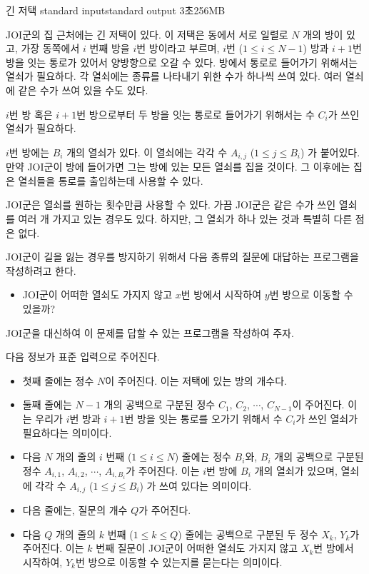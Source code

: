 \begin{problem}{긴 저택}
	{standard input}{standard output}
	{3초}{256MB}{}
	
	JOI군의 집 근처에는 긴 저택이 있다. 이 저택은 동에서 서로 일렬로 $N$ 개의 방이 있고, 가장 동쪽에서 $i$ 번째 방을 $i$번 방이라고 부르며, $i$번 ($1 \le i \le N-1$) 방과 $i+1$번 방을 잇는 통로가 있어서 양방향으로 오갈 수 있다. 방에서 통로로 들어가기 위해서는 열쇠가 필요하다. 각 열쇠에는 종류를 나타내기 위한 수가 하나씩 쓰여 있다. 여러 열쇠에 같은 수가 쓰여 있을 수도 있다.
	
	$i$번 방 혹은 $i+1$번 방으로부터 두 방을 잇는 통로로 들어가기 위해서는 수 $C_i$가 쓰인 열쇠가 필요하다.
	
	$i$번 방에는 $B_i$ 개의 열쇠가 있다. 이 열쇠에는 각각 수 $A_{i, j}$ ($1 \le j \le B_i$) 가 붙어있다. 만약 JOI군이 방에 들어가면 그는 방에 있는 모든 열쇠를 집을 것이다. 그 이후에는 집은 열쇠들을 통로를 출입하는데 사용할 수 있다.
	
	JOI군은 열쇠를 원하는 횟수만큼 사용할 수 있다. 가끔 JOI군은 같은 수가 쓰인 열쇠를 여러 개 가지고 있는 경우도 있다. 하지만, 그 열쇠가 하나 있는 것과 특별히 다른 점은 없다.
	
	JOI군이 길을 잃는 경우를 방지하기 위해서 다음 종류의 질문에 대답하는 프로그램을 작성하려고 한다.
	
	\begin{itemize}
		\item JOI군이 어떠한 열쇠도 가지지 않고 $x$번 방에서 시작하여 $y$번 방으로 이동할 수 있을까?
	\end{itemize}

	JOI군을 대신하여 이 문제를 답할 수 있는 프로그램을 작성하여 주자.
	
	\InputFile
	
	다음 정보가 표준 입력으로 주어진다.
	
	\begin{itemize}
		\item 첫째 줄에는 정수 $N$이 주어진다. 이는 저택에 있는 방의 개수다.
		\item 둘째 줄에는 $N-1$ 개의 공백으로 구분된 정수 $C_1$, $C_2$, $\cdots$, $C_{N-1}$이 주어진다. 이는 우리가 $i$번 방과 $i+1$번 방을 잇는 통로를 오가기 위해서 수 $C_i$가 쓰인 열쇠가 필요하다는 의미이다.
		\item 다음 $N$ 개의 줄의 $i$ 번째 ($1 \le i \le N$) 줄에는 정수 $B_i$와, $B_i$ 개의 공백으로 구분된 정수 $A_{i, 1}$, $A_{i, 2}$, $\cdots$, $A_{i, B_i}$가 주어진다. 이는 $i$번 방에 $B_i$ 개의 열쇠가 있으며, 열쇠에 각각 수 $A_{i, j}$ ($1 \le j \le B_i$) 가 쓰여 있다는 의미이다.
		\item 다음 줄에는, 질문의 개수 $Q$가 주어진다.
		\item 다음 $Q$ 개의 줄의 $k$ 번째 ($1 \le k \le Q$) 줄에는 공백으로 구분된 두 정수 $X_k$, $Y_k$가 주어진다. 이는 $k$ 번째 질문이 JOI군이 어떠한 열쇠도 가지지 않고 $X_k$번 방에서 시작하여, $Y_k$번 방으로 이동할 수 있는지를 묻는다는 의미이다.
	\end{itemize}
	

\end{problem}
